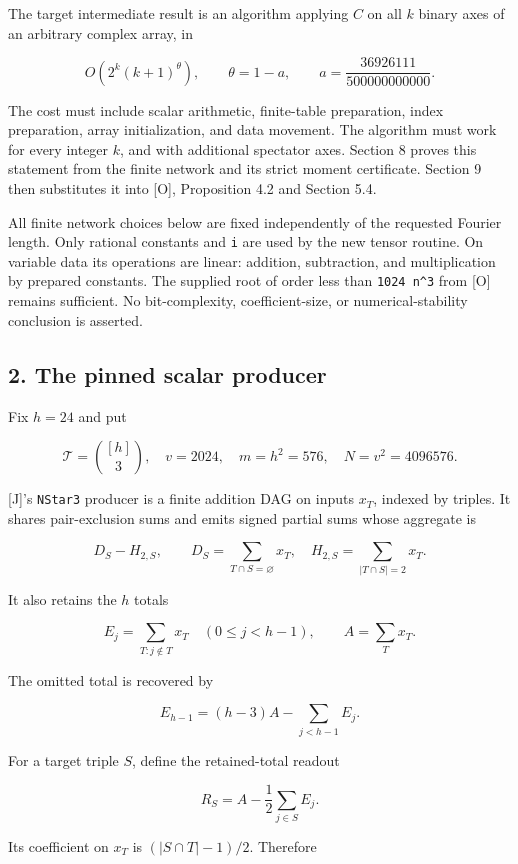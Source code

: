 \documentclass[
  11pt,
]{article}
\begin{document}
The target intermediate result is an algorithm applying \(C\) on all
\(k\) binary axes of an arbitrary complex array, in

\[
 O\!\left(2^k(k+1)^\theta\right),\qquad
 \theta=1-a,\qquad a=\frac{36926111}{500000000000}.
\]

The cost must include scalar arithmetic, finite-table preparation, index
preparation, array initialization, and data movement. The algorithm must
work for every integer \(k\), and with additional spectator axes.
Section 8 proves this statement from the finite network and its strict
moment certificate. Section 9 then substitutes it into {[}O{]},
Proposition 4.2 and Section 5.4.

All finite network choices below are fixed independently of the
requested Fourier length. Only rational constants and \texttt{i} are
used by the new tensor routine. On variable data its operations are
linear: addition, subtraction, and multiplication by prepared constants.
The supplied root of order less than \texttt{1024\ n\^{}3} from {[}O{]}
remains sufficient. No bit-complexity, coefficient-size, or
numerical-stability conclusion is asserted.

\subsection{2. The pinned scalar
producer}\label{the-pinned-scalar-producer}

Fix \(h=24\) and put

\[
 \mathcal T=\binom{[h]}3,\quad v=2024,\quad m=h^2=576,\quad N=v^2=4096576.
\]

{[}J{]}'s \texttt{NStar3} producer is a finite addition DAG on inputs
\(x_T\), indexed by triples. It shares pair-exclusion sums and emits
signed partial sums whose aggregate is

\[
 D_S-H_{2,S},\qquad
 D_S=\sum_{T\cap S=\varnothing}x_T,\quad
 H_{2,S}=\sum_{|T\cap S|=2}x_T.
\]

It also retains the \(h\) totals

\[
 E_j=\sum_{T:j\notin T}x_T\quad(0\le j<h-1),
 \qquad A=\sum_Tx_T.
\]

The omitted total is recovered by

\[
 E_{h-1}=(h-3)A-\sum_{j<h-1}E_j.
\]

For a target triple \(S\), define the retained-total readout

\[
 R_S=A-\frac12\sum_{j\in S}E_j.
\]

Its coefficient on \(x_T\) is \((|S\cap T|-1)/2\). Therefore
\end{document}
